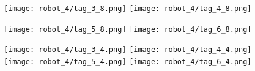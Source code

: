 \documentclass{article}
\begin{document}
\begin{figure}[h]
\texttt{[image: robot\_4/tag\_3\_8.png]} 
\texttt{[image: robot\_4/tag\_4\_8.png]} 


\texttt{[image: robot\_4/tag\_5\_8.png]} 
\texttt{[image: robot\_4/tag\_6\_8.png]} 


\texttt{[image: robot\_4/tag\_3\_4.png]} 
\texttt{[image: robot\_4/tag\_4\_4.png]} 
\texttt{[image: robot\_4/tag\_5\_4.png]} 
\texttt{[image: robot\_4/tag\_6\_4.png]} 

\end{figure}
\end{document}
